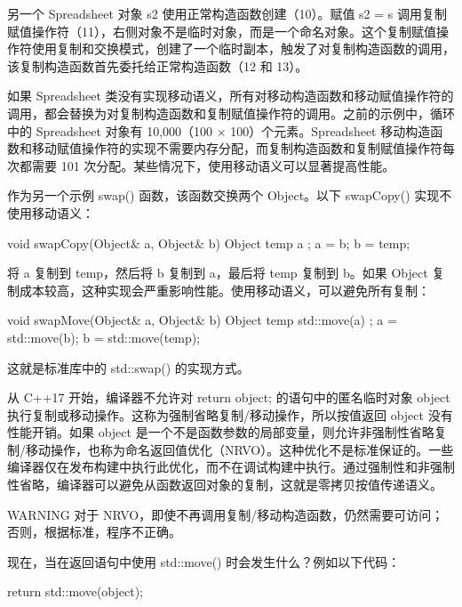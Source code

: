 另一个 Spreadsheet 对象 s2 使用正常构造函数创建（10）。赋值 s2 = s 调用复制赋值操作符（11），右侧对象不是临时对象，而是一个命名对象。这个复制赋值操作符使用复制和交换模式，创建了一个临时副本，触发了对复制构造函数的调用，该复制构造函数首先委托给正常构造函数（12 和 13）。

如果 Spreadsheet 类没有实现移动语义，所有对移动构造函数和移动赋值操作符的调用，都会替换为对复制构造函数和复制赋值操作符的调用。之前的示例中，循环中的 Spreadsheet 对象有 10,000（100 × 100）个元素。Spreadsheet 移动构造函数和移动赋值操作符的实现不需要内存分配，而复制构造函数和复制赋值操作符每次都需要 101 次分配。某些情况下，使用移动语义可以显著提高性能。


作为另一个示例 swap() 函数，该函数交换两个 Object。以下 swapCopy() 实现不使用移动语义：

\begin{cpp}
void swapCopy(Object& a, Object& b)
{
    Object temp { a };
    a = b;
    b = temp;
}
\end{cpp}

将 a 复制到 temp，然后将 b 复制到 a，最后将 temp 复制到 b。如果 Object 复制成本较高，这种实现会严重影响性能。使用移动语义，可以避免所有复制：

\begin{cpp}
void swapMove(Object& a, Object& b)
{
    Object temp { std::move(a) };
    a = std::move(b);
    b = std::move(temp);
}
\end{cpp}

这就是标准库中的 std::swap() 的实现方式。


从 C++17 开始，编译器不允许对 return object; 的语句中的匿名临时对象 object 执行复制或移动操作。这称为强制省略复制/移动操作，所以按值返回 object 没有性能开销。如果 object 是一个不是函数参数的局部变量，则允许非强制性省略复制/移动操作，也称为命名返回值优化（NRVO）。这种优化不是标准保证的。一些编译器仅在发布构建中执行此优化，而不在调试构建中执行。通过强制性和非强制性省略，编译器可以避免从函数返回对象的复制，这就是零拷贝按值传递语义。

\begin{myWarning}{WARNING}
对于 NRVO，即使不再调用复制/移动构造函数，仍然需要可访问；否则，根据标准，程序不正确。
\end{myWarning}

现在，当在返回语句中使用 std::move() 时会发生什么？例如以下代码：

\begin{cpp}
return std::move(object);
\end{cpp}

